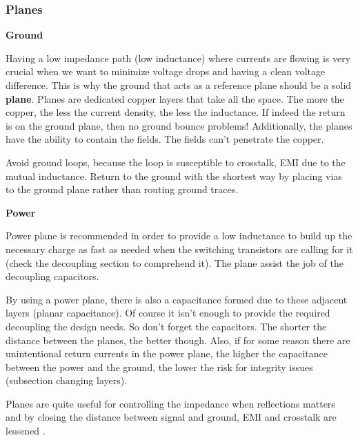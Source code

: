 \documentclass[final]{cubedoc}
\begin{document}
	\subsubsection{Planes}
	
	\textbf{Ground}
	
	Having a low impedance path (low inductance) where currents are flowing is very crucial when we want to minimize voltage drops and having a clean voltage difference. This is why the ground that acts as a reference plane should be a solid \textbf{plane}. Planes are dedicated copper layers that take all the space. The more the copper, the less the current density, the less the inductance. If indeed the return is on the ground plane, then no ground bounce problems! Additionally, the planes have the ability to contain the fields. The fields can't penetrate the copper.
	
	Avoid ground loops, because the loop is susceptible to crosstalk, EMI due to the mutual inductance. Return to the ground with the shortest way by placing vias to the ground plane rather than routing ground traces.
	
	\textbf{Power}
	
	Power plane is recommended in order to provide a low inductance to build up the necessary charge as fast as needed when the switching transistors are calling for it (check the decoupling section to comprehend it). The plane assist the job of the decoupling capacitors.
	
	By using a power plane, there is also a capacitance formed due to these adjacent layers (planar capacitance). Of course it isn't enough to provide the required decoupling the design needs. So don't forget the capacitors. The shorter the distance between the planes, the better though. Also, if for some reason there are unintentional return currents in the power plane, the higher the capacitance between the power and the ground, the lower the risk for integrity issues (subsection changing layers).
	
	
	Planes are quite useful for controlling the impedance when reflections matters and by closing the distance between signal and ground, EMI and crosstalk are lessened \cite{brooks2003signal, bogatin2009signal}.
	
\end{document}
